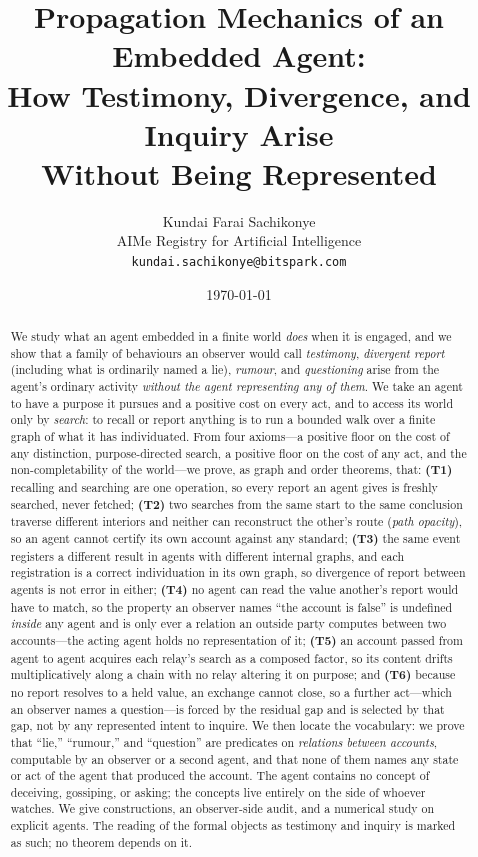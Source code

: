 \documentclass[11pt,twocolumn,a4paper]{article}
\title{\textbf{Propagation Mechanics of an Embedded Agent:\\
How Testimony, Divergence, and Inquiry Arise\\
Without Being Represented}}
\author{Kundai Farai Sachikonye\\[2pt]
\small AIMe Registry for Artificial Intelligence\\
\small \texttt{kundai.sachikonye@bitspark.com}}
\date{\today}
\begin{document}
\maketitle

\begin{abstract}
\noindent
We study what an agent embedded in a finite world \emph{does} when it is
engaged, and we show that a family of behaviours an observer would call
\emph{testimony}, \emph{divergent report} (including what is ordinarily
named a lie), \emph{rumour}, and \emph{questioning} arise from the agent's
ordinary activity \emph{without the agent representing any of them}. We take
an agent to have a purpose it pursues and a positive cost on every act,
and to access its world only by \emph{search}: to recall or report anything
is to run a bounded walk over a finite graph of what it has individuated.
From four axioms---a positive floor on the cost of any distinction,
purpose-directed search, a positive floor on the cost of any act, and the
non-completability of the world---we prove, as graph and order theorems,
that: \textbf{(T1)} recalling and searching are one operation, so every
report an agent gives is freshly searched, never fetched; \textbf{(T2)} two
searches from the same start to the same conclusion traverse different
interiors and neither can reconstruct the other's route (\emph{path
opacity}), so an agent cannot certify its own account against any standard;
\textbf{(T3)} the same event registers a different result in agents with
different internal graphs, and each registration is a correct individuation
in its own graph, so divergence of report between agents is not error in
either; \textbf{(T4)} no agent can read the value another's report would
have to match, so the property an observer names ``the account is false''
is undefined \emph{inside} any agent and is only ever a relation an outside
party computes between two accounts---the acting agent holds no
representation of it; \textbf{(T5)} an account passed from agent to agent
acquires each relay's search as a composed factor, so its content drifts
multiplicatively along a chain with no relay altering it on purpose; and
\textbf{(T6)} because no report resolves to a held value, an exchange cannot
close, so a further act---which an observer names a question---is forced by
the residual gap and is selected by that gap, not by any represented intent
to inquire. We then locate the vocabulary: we prove that ``lie,''
``rumour,'' and ``question'' are predicates on \emph{relations between
accounts}, computable by an observer or a second agent, and that none of
them names any state or act of the agent that produced the account. The
agent contains no concept of deceiving, gossiping, or asking; the concepts
live entirely on the side of whoever watches. We give constructions, an
observer-side audit, and a numerical study on explicit agents. The reading
of the formal objects as testimony and inquiry is marked as such; no
theorem depends on it.
\end{abstract}
\end{document}
